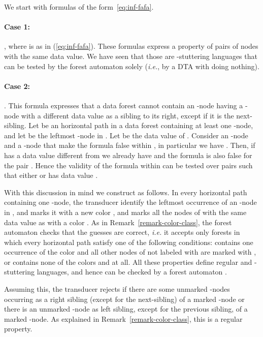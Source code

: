 \documentclass{CSML}
\newcommand\dad{\textup{DTA}\xspace}
\begin{document}
\medskip\noindent
We start with formulas of the form~\eqref{eq:inf-fafa}. 

\paragraph{\bf Case 1:}
,
where  is as in (\ref{eq:inf-fafa}).
These formulas express a property of pairs of nodes with the same data value.
We have seen that those are -stuttering languages that can be tested
by the forest automaton  solely (\textit{i.e.}, by a \dad with  doing
nothing).


\paragraph{\bf Case 2:}
.
This formula expresses that a data forest cannot contain 
an -node having a -node with a different data value
as a sibling to its right, except if it is the next-sibling.
Let  be an horizontal path in a data forest  containing at least one
-node, and let  be the leftmost -node in . 
Let  be the data value of . 
Consider an -node  and a -node  that make the formula
false within , in particular we have . Then, if  has a data
value different from  we already have  and the formula is
also false for the pair .
Hence the validity of the formula within  can be tested over pairs  such that
either  or  has data value .

\noindent
With this discussion in mind we construct  as follows. In every horizontal path 
containing one -node, the transducer  identify the leftmost
occurrence  of an -node in , and marks it with a new color , 
and marks all the nodes of  with the same data value as  with a color .  
As in Remark~\ref{remark-color-class}, the forest automaton  checks that the
guesses are correct, \textit{i.e.} it accepts only forests in which every horizontal
path  satisfy one of the following conditions: 
 contains one occurrence of the color  
and all other nodes of  not labeled with  are marked with , 
or  contains none of the colors  and  at all. 
All these properties define regular and -stuttering languages, 
and hence can be checked by a forest automaton .

Assuming this, the transducer  rejects if there are some unmarked
-nodes occurring as a right sibling (except for the next-sibling) of a
marked -node or there is an unmarked -node as
left sibling, except for the previous sibling, of a marked -node.  
As explained in Remark~\ref{remark-color-class}, this is a regular property.
\end{document}
